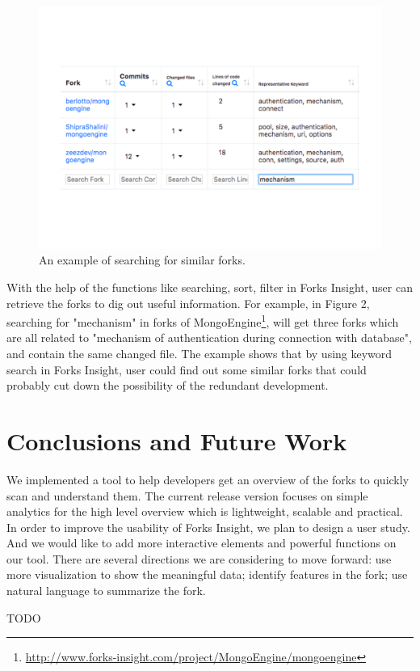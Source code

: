 \begin{figure}[]
\centering
\includegraphics[scale=0.3]{pic5.pdf}
\caption{An example of searching for similar forks.}
\vspace{5pt}
\end{figure}

With the help of the functions like searching, sort, filter in Forks Insight, user can retrieve the forks to dig out useful information. For example, in Figure 2, searching for "mechanism" in forks of MongoEngine\footnote{\url{http://www.forks-insight.com/project/MongoEngine/mongoengine}}, will get three forks which are all related to "mechanism of authentication during connection with database", and contain the same changed file. The example shows that by using keyword search in Forks Insight, user could find out some similar forks that could probably cut down the possibility of the redundant development.

\section{Conclusions and Future Work}
We implemented a tool to help developers get an overview of the forks to quickly scan and understand them. The current release version focuses on simple analytics for the high level overview which is lightweight, scalable and practical. In order to improve the usability of Forks Insight, we plan to design a user study. And we would like to add more interactive elements and powerful functions on our tool. There are several directions we are considering to move forward: use more visualization to show the meaningful data; identify features in the fork; use natural language to summarize the fork.

\begin{acks}
  TODO
\end{acks}


